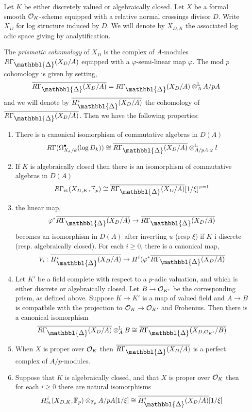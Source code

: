 \documentclass[12pt]{article}
\newcommand{\Prism}{{\mathlarger{\mathbbl{\Delta}}}}
\begin{document}
Let $K$ be either discretely valued or algebraically closed. Let $X$ be a formal smooth $\mathcal{O}_K$-scheme equipped with a relative normal crossings divisor $D$. Write $X_D$ for log structure induced by $D$. We will denote by $X_{D,K}$ the associated log adic space giving by analytification. 
\par 
The \textit{prismatic cohomology} of $X_D$ is the complex of $A$-modules $R \Gamma_{\Prism}(X_D/A)$ equipped with a $\varphi$-semi-linear map $\varphi$. The mod $p$ cohomology is given by setting,
\[ \ol{R \Gamma_{\Prism}(X_D/A)} = R \Gamma_{\Prism}(X_D/A) \ot_A^{\LL} A / p A \]
and we will denote by $\ol{H^i_{\Prism}(X_D/A)}$ the cohomology of $\ol{R \Gamma_{\Prism}(X_D/A)}$. Then we have the following properties:
\begin{enumerate}
\item There is a canonical isomorphism of commutative algebras in $D(A)$
\[ R \Gamma(\Omega^\bullet_{X_k/k}(\log{D_k})) \cong \ol{R \Gamma_{\Prism}(X_D/A)} \ot^{\LL}_{A/pA, \varphi} l \]
\item If $K$ is algebraically closed then there is an isomorphism of commutative algebras in $D(A)$
\[ R \Gamma_{\et}(X_{D,K}, \FF_p) \cong \ol{R \Gamma_{\Prism}(X_D/A)}[1/\xi]^{\varphi=1} \]
\item the linear map,
\[ \varphi^* \ol{R \Gamma_{\Prism}(X_D/A)} \to \ol{R \Gamma_{\Prism}(X_D/A)} \]
becomes an isomorphism in $D(A)$ after inverting $u$ (resp $\xi$) if $K$ i discrete (resp. algebraically closed). For each $i \ge 0$, there is a canonical map,
\[ V_i : \ol{H^i_{\Prism}(X_D/A)} \to H^i(\varphi^* \ol{R \Gamma_{\Prism}(X_D/A)} \]
\item Let $K'$ be a field complete with respect to a $p$-adic valuation, and which is either discrete or algebraically closed. Let $B \to \mathcal{O}_{K'}$ be the corresponding prism, as defined above. Suppose $K \to K'$ is a map of valued field and $A \to B$ is compatbile with the projection to $\mathcal{O}_K \to \mathcal{O}_{K'}$ and Frobenius. Then there is a canonical isomorphism
\[ \ol{R \Gamma_{\Prism}(X_D/A)} \ot_A^{\LL} B \cong \ol{R \Gamma_{\Prism}(X_{D, \cO_{K'}}/B)} \]
\item When $X$ is proper over $\mathcal{O}_K$ then $\ol{R \Gamma_{\Prism}(X_D/A)}$ is a perfect complex of $A/p$-modules.
\item Suppose that $K$ is algebraically closed, and that $X$ is proper over $\mathcal{O}_K$ then for each $i \ge 0$ there are natural isomorphisms
\[ H^i_{\et}(X_{D,K}, \FF_p) \ot_{\FF_p} A / p A[1/\xi] \cong \ol{H^i_{\Prism}(X_D/A)}[1/\xi] \]
\end{enumerate}
\end{document}
